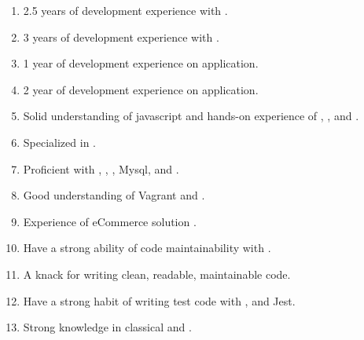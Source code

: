   \begin{enumerate}[leftmargin=4ex, nosep, noitemsep]
    \item 2.5 years of development experience with .
    \item 3 years of development experience with .
    \item 1 year of development experience on  application.
    \item 2 year of development experience on  application.
    \item Solid understanding of javascript and hands-on experience of
        , ,  and .
    \item Specialized in .
    \item Proficient with , , , Mysql, and .
    \item Good understanding of Vagrant and .
    \item Experience of eCommerce solution .
    \item Have a strong ability of code maintainability with .
    \item A knack for writing clean, readable, maintainable code.
    \item Have a strong habit of writing test code with ,  and Jest.
    \item Strong knowledge in classical  and .
  \end{enumerate}

